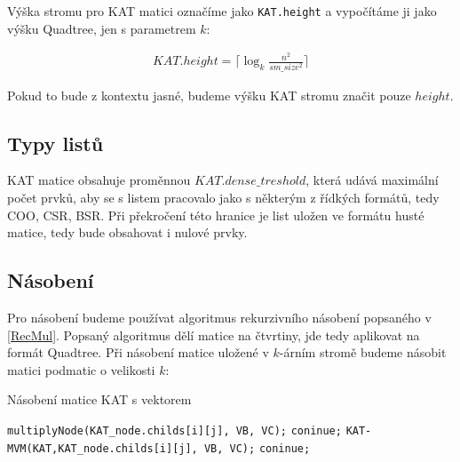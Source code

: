 Výška stromu pro KAT matici označíme jako \texttt{KAT.height} a vypočítáme ji jako výšku Quadtree, jen s parametrem $k$:

\label{katheight}
\begin{align}
KAT.height = \Bigg\lceil\log_{k}\frac{n^2}{sm\_size^2}\Bigg\rceil
\end{align}

Pokud to bude z kontextu jasné, budeme výšku KAT stromu značit pouze $height$.


\subsection{Typy listů}

KAT matice obsahuje proměnnou $KAT.dense\_treshold$, která udává maximální počet prvků, aby se s listem pracovalo jako s některým z řídkých formátů, tedy COO, CSR, BSR. Při překročení této hranice je list uložen ve formátu husté matice, tedy bude obsahovat i nulové prvky.


\subsection{Násobení}

Pro násobení budeme používat algoritmus rekurzivního násobení popsaného v \ref{RecMul}. Popsaný algoritmus dělí matice na čtvrtiny, jde tedy aplikovat na formát Quadtree. Při násobení matice uložené v $k$-árním stromě budeme násobit matici podmatic o velikosti $k$:

\label{alg:kat-mvm}
\begin{algorithm}[htb]
	\caption{Násobení matice KAT s vektorem}\label{kat-mvm}
	\begin{algorithmic}[1]
						\State \texttt{multiplyNode(KAT\_node.childs[i][j], VB, VC);}
						\State \texttt{coninue;}
					\EndIf
						\State \texttt{KAT-MVM(KAT,KAT\_node.childs[i][j], VB, VC);}
						\State \texttt{coninue;}
					\EndIf
				\EndIf
			\EndFor
		\EndFor
		\EndProcedure
	\end{algorithmic}
\end{algorithm}

